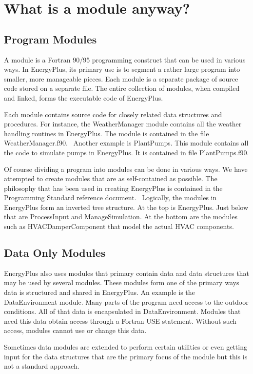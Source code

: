 \section{What is a module anyway?}\label{what-is-a-module-anyway}

\subsection{Program Modules}\label{program-modules}

A module is a Fortran 90/95 programming construct that can be used in various ways. In EnergyPlus, its primary use is to segment a rather large program into smaller, more manageable pieces. Each module is a separate package of source code stored on a separate file. The entire collection of modules, when compiled and linked, forms the executable code of EnergyPlus.

Each module contains source code for closely related data structures and procedures. For instance, the WeatherManager module contains all the weather handling routines in EnergyPlus. The module is contained in the file WeatherManager.f90.~ Another example is PlantPumps. This module contains all the code to simulate pumps in EnergyPlus. It is contained in file PlantPumps.f90.

Of course dividing a program into modules can be done in various ways. We have attempted to create modules that are as self-contained as possible. The philosophy that has been used in creating EnergyPlus is contained in the Programming Standard reference document.~ Logically, the modules in EnergyPlus form an inverted tree structure. At the top is EnergyPlus. Just below that are ProcessInput and ManageSimulation. At the bottom are the modules such as HVACDamperComponent that model the actual HVAC components.

\subsection{Data Only Modules}\label{data-only-modules}

EnergyPlus also uses modules that primary contain data and data structures that may be used by several modules. These modules form one of the primary ways data is structured and shared in EnergyPlus. An example is the DataEnvironment module. Many parts of the program need access to the outdoor conditions. All of that data is encapsulated in DataEnvironment. Modules that need this data obtain access through a Fortran USE statement. Without such access, modules cannot use or change this data.

Sometimes data modules are extended to perform certain utilities or even getting input for the data structures that are the primary focus of the module but this is not a standard approach.
